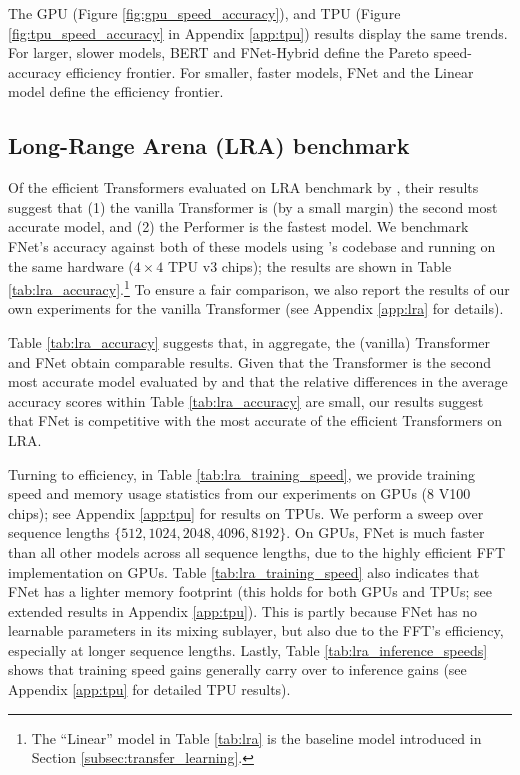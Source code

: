 \documentclass[11pt]{article}
\begin{document}
The GPU (Figure \ref{fig:gpu_speed_accuracy}), and TPU (Figure \ref{fig:tpu_speed_accuracy} in Appendix \ref{app:tpu}) results display the same trends. For larger, slower models, BERT and FNet-Hybrid define the Pareto speed-accuracy efficiency frontier. For smaller, faster models, FNet and the Linear model define the efficiency frontier.

\subsection{Long-Range Arena (LRA) benchmark}
\label{subsec:lra}

Of the efficient Transformers evaluated on LRA benchmark by \citet{tay2020long}, their results suggest that (1) the vanilla Transformer is (by a small margin) the second most accurate model, and (2) the Performer \citep{choromanski2020rethinking} is the fastest model.  We benchmark FNet's accuracy against both of these models using \citet{tay2020long}'s codebase and running on the same hardware ($4\times4$ TPU v3 chips); the results are shown in Table \ref{tab:lra_accuracy}.\footnote{The ``Linear'' model in Table \ref{tab:lra} is the baseline model introduced in Section \ref{subsec:transfer_learning}.} To ensure a fair comparison, we also report the results of our own experiments for the vanilla Transformer (see Appendix \ref{app:lra} for details). 

Table \ref{tab:lra_accuracy} suggests that, in aggregate, the (vanilla) Transformer and FNet obtain comparable results. Given that the Transformer is the second most accurate model evaluated by \citet{tay2020long} and that the relative differences in the average accuracy scores within Table \ref{tab:lra_accuracy} are small, our results suggest that FNet is competitive with the most accurate of the efficient Transformers on LRA.

Turning to efficiency, in Table \ref{tab:lra_training_speed}, we provide training speed and memory usage statistics from our experiments on GPUs ($8$ V100 chips); see Appendix \ref{app:tpu} for results on TPUs. We perform a sweep over sequence lengths $\{512, 1024, 2048, 4096, 8192\}$. On GPUs, FNet is much faster than all other models across all sequence lengths, due to the highly efficient FFT implementation on GPUs.  Table \ref{tab:lra_training_speed} also indicates that FNet has a lighter memory footprint (this holds for both GPUs and TPUs; see extended results in Appendix \ref{app:tpu}). This is partly because FNet has no learnable parameters in its mixing sublayer, but also due to the FFT's efficiency, especially at longer sequence lengths. Lastly, Table \ref{tab:lra_inference_speeds} shows that training speed gains generally carry over to inference gains (see Appendix \ref{app:tpu} for detailed TPU results).
\end{document}
